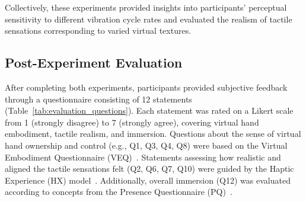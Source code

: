 Collectively, these experiments provided insights into participants' perceptual sensitivity to different vibration cycle rates and evaluated the realism of tactile sensations corresponding to varied virtual textures.

\newpage
\subsection{Post-Experiment Evaluation}
After completing both experiments, participants provided subjective feedback through a questionnaire consisting of 12 statements (Table~\ref{tab:evaluation_questions}). Each statement was rated on a Likert scale from 1 (strongly disagree) to 7 (strongly agree), covering virtual hand embodiment, tactile realism, and immersion. Questions about the sense of virtual hand ownership and control (e.g., Q1, Q3, Q4, Q8) were based on the Virtual Embodiment Questionnaire (VEQ)~\cite{10.1145/3027063.3053272}. Statements assessing how realistic and aligned the tactile sensations felt (Q2, Q6, Q7, Q10) were guided by the Haptic Experience (HX) model~\cite{10.1016/j.ijhcs.2017.04.004}. Additionally, overall immersion (Q12) was evaluated according to concepts from the Presence Questionnaire (PQ)~\cite{10.1162/105474698565686}.

